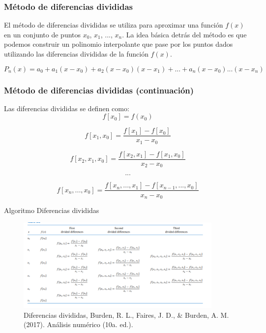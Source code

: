 \documentclass{beamer}
\begin{document}
\begin{frame}
\frametitle{Método de diferencias divididas}

El método de diferencias divididas se utiliza para aproximar una función $f(x)$ en un conjunto de puntos $x_0$, $x_1$, ..., $x_n$. La idea básica detrás del método es que podemos construir un polinomio interpolante que pase por los puntos dados utilizando las diferencias divididas de la función $f(x)$. 

\[
P_n(x)=a_0 + a_1(x-x_0) +a_2(x-x_0) (x-x_1) + . . . +a_n(x-x_0)...(x-x_n)
\]
\end{frame}




\begin{frame}
\frametitle{Método de diferencias divididas (continuación)}

Las diferencias divididas se definen como:
$$
f[x_0] = f(x_0)
$$

$$
f[x_1,x_0] = \frac{f[x_1] - f[x_0]}{x_1 - x_0}
$$

$$
f[x_2,x_1,x_0] = \frac{f[x_2,x_1] - f[x_1,x_0]}{x_2 - x_0}
$$

$$
...
$$

$$
f[x_n,...,x_0] = \frac{f[x_n,...,x_1] - f[x_{n-1},...,x_0]}{x_n - x_0}
$$

\end{frame}



\begin{frame}{Algoritmo Diferencias divididas}
 \begin{figure}
    \includegraphics[width=0.9\textwidth]{esquemadiferenciasDivividas.png}
    \caption{Diferencias divididas, Burden, R. L., Faires, J. D., & Burden, A. M. (2017). Análisis numérico (10a. ed.).  } 
\end{figure} 
\end{frame}
\end{document}
